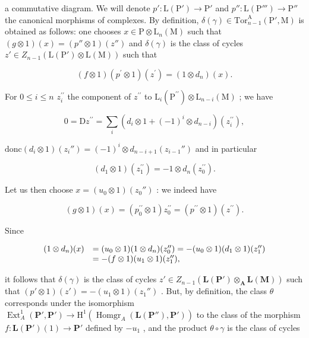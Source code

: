 a commutative diagram. We will denote \(p' : \mathrm{L}(\mathrm{P}') \to \mathrm{P}'\) and \(p'' : \mathrm{L}(\mathrm{P}''') \to \mathrm{P}''\) the canonical morphisms of complexes. By definition, \(\delta(\gamma) \in \mathrm{Tor}_{n-1}^{\mathrm{A}}(\mathrm{P}', \mathrm{M})\) is obtained as follows: one chooses \(x \in \mathrm{P} \otimes \mathrm{L}_n(\mathrm{M})\) such that \((g \otimes 1)(x) = (p'' \otimes 1)(z'')\) and \(\delta(\gamma)\) is the class of cycles \(z' \in Z_{n-1}(\mathrm{L}(\mathrm{P}') \otimes \mathrm{L}(\mathrm{M}))\) such that

\[
(f \otimes 1) (p ^ {\prime} \otimes 1) (z ^ {\prime}) = (1 \otimes d _ {n}) (x).
\]

For \(0 \leqslant i \leqslant n\)  \(z_{i}^{\prime \prime}\) the component of \(z^{\prime \prime}\) to \(\mathrm{L}_{i}(\mathrm{P}^{\prime \prime}) \otimes \mathrm{L}_{n - i}(\mathrm{M})\) ; we have

\[
0 = \mathrm{D} z ^ {\prime \prime} = \sum_ {i} \left(d _ {i} \otimes 1 + (- 1) ^ {i} \otimes d _ {n - i}\right) (z _ {i} ^ {\prime \prime}),
\]

\(\mathrm{donc}(d_i \otimes 1)(z_i'') = (-1)^i \otimes d_{n-i+1}(z_{i-1}'')\) and in particular

\[
\left(d _ {1} \otimes 1\right) \left(z _ {1} ^ {\prime \prime}\right) = - 1 \otimes d _ {n} \left(z _ {0} ^ {\prime \prime}\right).
\]

Let us then choose \(x = (u_0 \otimes 1)(z_0'')\) : we indeed have

\[
(g \otimes 1) (x) = \left(p _ {0} ^ {\prime \prime} \otimes 1\right) z _ {0} ^ {\prime \prime} = \left(p ^ {\prime \prime} \otimes 1\right) \left(z ^ {\prime \prime}\right).
\]

Since

\[
\begin{array}{r l} (1 \otimes d _ {n}) (x) & = (u _ {0} \otimes 1) (1 \otimes d _ {n}) (z _ {0} ^ {\prime \prime}) = - (u _ {0} \otimes 1) (d _ {1} \otimes 1) (z _ {1} ^ {\prime \prime}) \\ & = - (f \otimes 1) (u _ {1} \otimes 1) (z _ {1} ^ {\prime \prime}), \end{array}
\]

it follows that \(\delta(\gamma)\) is the class of cycles \(z' \in Z_{n-1}(\mathbf{L}(\mathbf{P}') \otimes_{\mathbf{A}} \mathbf{L}(\mathbf{M}))\) such that \((p' \otimes 1)(z') = -(u_1 \otimes 1)(z_1'')\) . But, by definition, the class \(\theta\) corresponds under the isomorphism \(\operatorname{Ext}_A^1(\mathbf{P}', \mathbf{P}') \to \mathrm{H}^1(\operatorname{Homgr}_A(\mathbf{L}(\mathbf{P}''), \mathbf{P'}))\) to the class of the morphism \(f: \mathbf{L}(\mathbf{P}') (1) \to \mathbf{P}'\) defined by \(-u_1\) , and the product \(\theta \circ \gamma\) is the class of cycles

